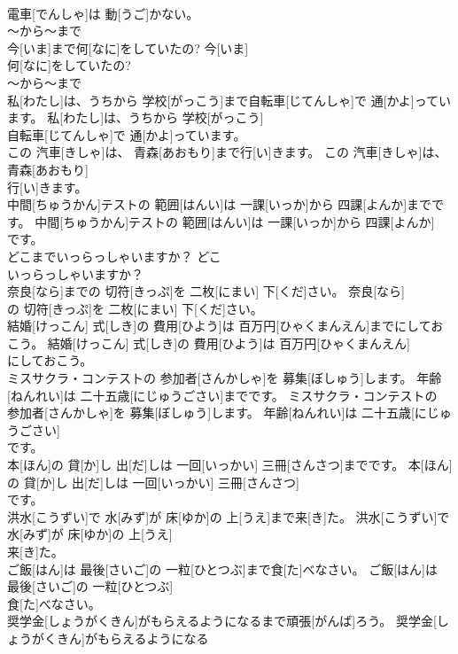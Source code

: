 \documentclass[8pt]{extreport}
\begin{document}
\begin{CJK}{UTF8}{min}
\\	電車[でんしゃ]は 動[うご]かない。	
\\	～から～まで
\\	今[いま]まで何[なに]をしていたの?	今[いま]
\\	何[なに]をしていたの?	
\\	～から～まで
\\	私[わたし]は、うちから 学校[がっこう]まで自転車[じてんしゃ]で 通[かよ]っています。	私[わたし]は、うちから 学校[がっこう]
\\	自転車[じてんしゃ]で 通[かよ]っています。	
\\	この 汽車[きしゃ]は、 青森[あおもり]まで行[い]きます。	この 汽車[きしゃ]は、 青森[あおもり]
\\	行[い]きます。	
\\	中間[ちゅうかん]テストの 範囲[はんい]は 一課[いっか]から 四課[よんか]までです。	中間[ちゅうかん]テストの 範囲[はんい]は 一課[いっか]から 四課[よんか]
\\	です。	
\\	どこまでいっらっしゃいますか？	どこ
\\	いっらっしゃいますか？	
\\	奈良[なら]までの 切符[きっぷ]を 二枚[にまい] 下[くだ]さい。	奈良[なら]
\\	の 切符[きっぷ]を 二枚[にまい] 下[くだ]さい。	
\\	結婚[けっこん] 式[しき]の 費用[ひよう]は 百万円[ひゃくまんえん]までにしておこう。	結婚[けっこん] 式[しき]の 費用[ひよう]は 百万円[ひゃくまんえん]
\\	にしておこう。	
\\	ミスサクラ・コンテストの 参加者[さんかしゃ]を 募集[ぼしゅう]します。 年齢[ねんれい]は 二十五歳[にじゅうごさい]までです。	ミスサクラ・コンテストの 参加者[さんかしゃ]を 募集[ぼしゅう]します。 年齢[ねんれい]は 二十五歳[にじゅうごさい]
\\	です。	
\\	本[ほん]の 貸[か]し 出[だ]しは 一回[いっかい] 三冊[さんさつ]までです。	本[ほん]の 貸[か]し 出[だ]しは 一回[いっかい] 三冊[さんさつ]
\\	です。	
\\	洪水[こうずい]で 水[みず]が 床[ゆか]の 上[うえ]まで来[き]た。	洪水[こうずい]で 水[みず]が 床[ゆか]の 上[うえ]
\\	来[き]た。	
\\	ご飯[はん]は 最後[さいご]の 一粒[ひとつぶ]まで食[た]べなさい。	ご飯[はん]は 最後[さいご]の 一粒[ひとつぶ]
\\	食[た]べなさい。	
\\	奨学金[しょうがくきん]がもらえるようになるまで頑張[がんば]ろう。	奨学金[しょうがくきん]がもらえるようになる

\end{CJK}
\end{document}
